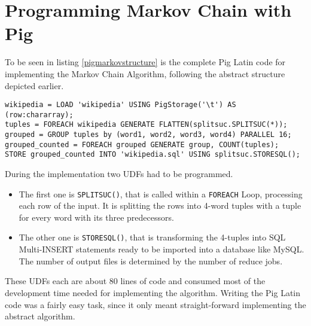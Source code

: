\section{Programming Markov Chain with Pig}                                              

To be seen in listing \ref{pigmarkovstructure} is the complete Pig Latin code for implementing the Markov Chain Algorithm, following the abstract structure depicted earlier.
                         
\begin{lstlisting}[language=pig,caption=Markov Chain in Pig Latin,label=pigmarkovstructure]    
wikipedia = LOAD 'wikipedia' USING PigStorage('\t') AS (row:chararray);
tuples = FOREACH wikipedia GENERATE FLATTEN(splitsuc.SPLITSUC(*));
grouped = GROUP tuples by (word1, word2, word3, word4) PARALLEL 16;
grouped_counted = FOREACH grouped GENERATE group, COUNT(tuples);
STORE grouped_counted INTO 'wikipedia.sql' USING splitsuc.STORESQL();
\end{lstlisting}                  

During the implementation two UDFs had to be programmed. 
\begin{itemize}
\item The first one is {\tt SPLITSUC()}, that is called within a {\tt FOREACH} Loop, processing each row of the input. It is splitting the rows into 4-word tuples with a tuple for every word with its three predecessors.
\item The other one is {\tt STORESQL()}, that is transforming the 4-tuples into SQL Multi-INSERT statements ready to be imported into a database like MySQL. The number of output files is determined by the number of reduce jobs.
\end{itemize}

These UDFs each are about 80 lines of code and consumed most of the development time needed for implementing the algorithm. Writing the Pig Latin code was a fairly easy task, since it only meant straight-forward implementing the abstract algorithm.



